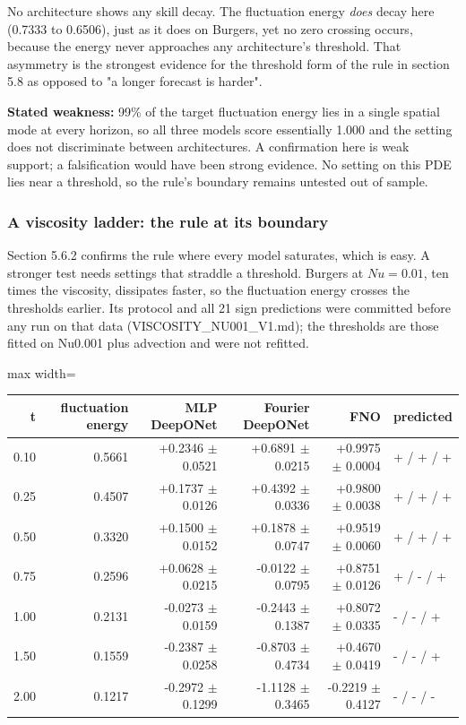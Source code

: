 \documentclass[preprint,12pt]{elsarticle}
\begin{document}
No architecture shows any skill decay. The fluctuation energy \emph{does} decay here (0.7333 to 0.6506), just as it does on Burgers, yet no zero crossing occurs, because the energy never approaches any architecture's threshold. That asymmetry is the strongest evidence for the threshold form of the rule in section 5.8 as opposed to "a longer forecast is harder".

\textbf{Stated weakness:} 99\% of the target fluctuation energy lies in a single spatial mode at every horizon, so all three models score essentially 1.000 and the setting does not discriminate between architectures. A confirmation here is weak support; a falsification would have been strong evidence. No setting on this PDE lies near a threshold, so the rule's boundary remains untested out of sample.

\subsubsection{A viscosity ladder: the rule at its boundary}

Section 5.6.2 confirms the rule where every model saturates, which is easy. A stronger test needs settings that straddle a threshold. Burgers at $Nu = 0.01$, ten times the viscosity, dissipates faster, so the fluctuation energy crosses the thresholds earlier. Its protocol and all 21 sign predictions were committed before any run on that data (VISCOSITY\_NU001\_V1.md); the thresholds are those fitted on Nu0.001 plus advection and were not refitted.

\begin{center}
\begin{adjustbox}{max width=\linewidth}
\small
\begin{tabular}{rrrrrl}
\toprule
t & fluctuation energy & MLP DeepONet & Fourier DeepONet & FNO & predicted \\
\midrule
0.10 & 0.5661 & +0.2346 $\pm$ 0.0521 & +0.6891 $\pm$ 0.0215 & +0.9975 $\pm$ 0.0004 & + / + / + \\
0.25 & 0.4507 & +0.1737 $\pm$ 0.0126 & +0.4392 $\pm$ 0.0336 & +0.9800 $\pm$ 0.0038 & + / + / + \\
0.50 & 0.3320 & +0.1500 $\pm$ 0.0152 & +0.1878 $\pm$ 0.0747 & +0.9519 $\pm$ 0.0060 & + / + / + \\
0.75 & 0.2596 & +0.0628 $\pm$ 0.0215 & -0.0122 $\pm$ 0.0795 & +0.8751 $\pm$ 0.0126 & + / - / + \\
1.00 & 0.2131 & -0.0273 $\pm$ 0.0159 & -0.2443 $\pm$ 0.1387 & +0.8072 $\pm$ 0.0335 & - / - / + \\
1.50 & 0.1559 & -0.2387 $\pm$ 0.0258 & -0.8703 $\pm$ 0.4734 & +0.4670 $\pm$ 0.0419 & - / - / + \\
2.00 & 0.1217 & -0.2972 $\pm$ 0.1299 & -1.1128 $\pm$ 0.3465 & -0.2219 $\pm$ 0.4127 & - / - / - \\
\bottomrule
\end{tabular}
\end{adjustbox}
\end{center}
\end{document}
